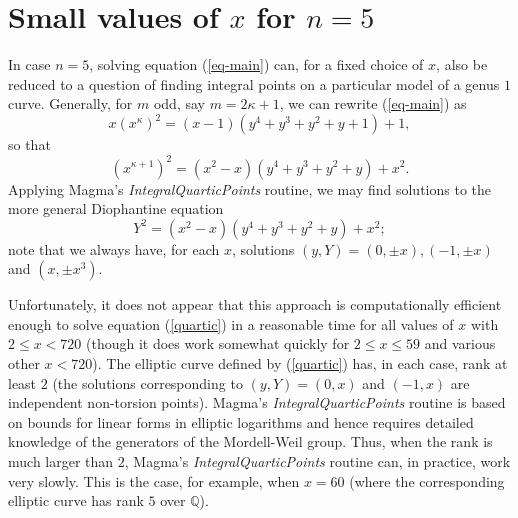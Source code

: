 { %
 \section{Small values of $x$ for $n=5$} \label{TM}
 
 In case $n=5$, solving equation (\ref{eq-main}) can, for a fixed choice of $x$, also be reduced to a question of finding integral points on a particular model of a genus $1$ curve.
 Generally, for $m$ odd, say $m= 2 \kappa+1$, we can rewrite  (\ref{eq-main}) as
 $$
 x \left( x^{\kappa} \right)^2 = (x-1) \left( y^4+y^3+y^2+y+1 \right) + 1,
 $$
 so that 
 $$
 \left( x^{\kappa+1} \right)^2 = (x^2-x) \left( y^4+y^3+y^2+y \right) + x^2.
 $$
 Applying Magma's {\it IntegralQuarticPoints} routine, 
 we may find solutions to the more general Diophantine equation
 \begin{equation} \label{quartic}
 Y^2 = (x^2-x) \left( y^4+y^3+y^2+y \right) + x^2;
 \end{equation}
 note that we always have, for each $x$, solutions $(y,Y) = (0, \pm x), (-1, \pm x)$ and $(x, \pm x^3)$. 
 
 Unfortunately, it does not appear that this approach is computationally efficient enough to solve equation (\ref{quartic}) in a reasonable time for all values of $x$ with  $2 \leq x < 720$ (though it does work somewhat quickly for $2 \leq x \leq 59$ and various other $x < 720$). The elliptic curve defined by (\ref{quartic}) has, in each case, rank at least $2$ (the solutions corresponding to $(y,Y) = (0, x)$ and $(-1, x)$ are independent non-torsion points). Magma's {\it IntegralQuarticPoints} routine is based on bounds for  linear forms in elliptic logarithms and hence requires detailed knowledge of the generators of the Mordell-Weil group. Thus, when the rank is much larger than $2$, Magma's   {\it IntegralQuarticPoints} routine can, in practice, work very slowly. This is the case, for example, when $x=60$ (where the corresponding elliptic curve has rank $5$ over $\mathbb{Q}$).  

 
 
}
